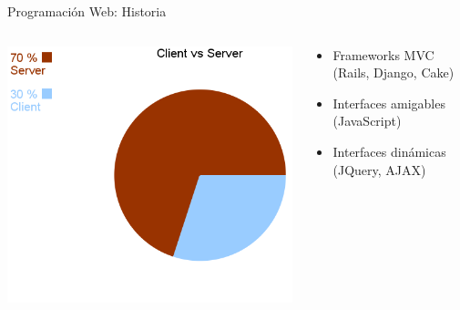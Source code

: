 \documentclass[xcolor=dvipsnames, 14pt]{beamer}
\begin{document}
\begin{frame}{Programación Web: Historia}
    \begin{columns}[c]
        \begin{column}{0.5\textwidth}
            \begin{center}
                \includegraphics[width=\textwidth]{img/historia2.png}
            \end{center}
        \end{column}
        \begin{column}{0.5\textwidth}
            \begin{itemize}
                \item Frameworks MVC (Rails, Django, Cake)
                \item Interfaces amigables (JavaScript)
                \item Interfaces dinámicas (JQuery, AJAX)
            \end{itemize}
        \end{column}
    \end{columns}

\end{frame}
\end{document}
